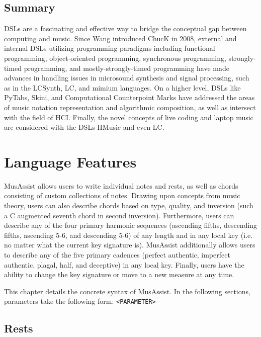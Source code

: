 \documentclass{report}
\newcommand\param[1]{\verb!<#1>!}
\begin{document}
\section{Summary}
DSLs are a fascinating and effective way to bridge the conceptual gap between computing and music. Since Wang introduced ChucK in 2008, external and internal DSLs utilizing programming paradigms including functional programming, object-oriented programming, synchronous programming, strongly-timed programming, and mostly-strongly-timed programming have made advances in handling issues in microsound synthesis and signal processing, such as in the LCSynth, LC, and mimium languages. On a higher level, DSLs like PyTabs, Skini, and Computational Counterpoint Marks have addressed the areas of music notation representation and algorithmic composition, as well as intersect with the field of HCI. Finally, the novel concepts of live coding and laptop music are considered with the DSLs HMusic and even LC. 

\chapter{Language Features}

MusAssist allows users to write individual notes and rests, as well as chords consisting of custom collections of notes. Drawing upon concepts from music theory, users can also describe chords based on type, quality, and inversion (such a C augmented seventh chord in second inversion). Furthermore, users can describe any of the four primary harmonic sequences (ascending fifths, descending fifths, ascending 5-6, and descending 5-6) of any length and in any local key (i.e. no matter what the current key signature is). MusAssist additionally allows users to describe any of the five primary cadences (perfect authentic, imperfect authentic, plagal, half, and deceptive) in any local key. Finally, users have the ability to change the key signature or move to a new measure at any time.

This chapter details the concrete syntax of MusAssist. In the following sections, parameters take the following form: \param{PARAMETER}
\section{Rests}
\label{sec:rests}
\end{document}
